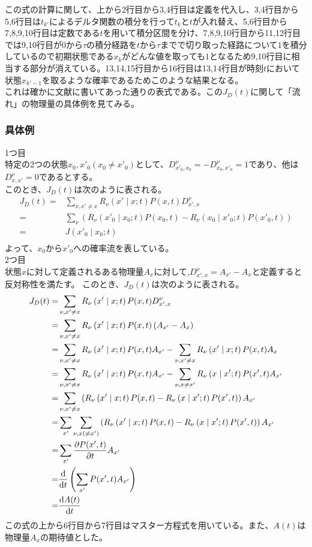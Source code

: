 \documentclass{ltjsarticle}
\begin{document}
この式の計算に関して、上から2行目から3,4行目は定義を代入し、3,4行目から5,6行目は$t_{k'}$によるデルタ関数の積分を行って$t_k$と$t$が入れ替え、5,6行目から7,8,9,10行目は定数である$t$を用いて積分区間を分け、7,8,9,10行目から11,12行目では9,10行目が$0$から$\tau$の積分経路を$t$から$\tau$までで切り取った経路について$1$を積分しているので初期状態である$x_k$がどんな値を取っても$1$となるため9,10行目に相当する部分が消えている。13,14,15行目から16行目は13,14行目が時刻$t$において状態$x_{k'-1}$を取るような確率であるためこのような結果となる。\\
これは確かに文献に書いてあった通りの表式である。この$J_D(t)$に関して「流れ」の物理量の具体例を見てみる。
\subsubsection{具体例}
1つ目\\
特定の2つの状態$x_0,x'_0(x_0\neq x'_0)$として、$D^{\nu}_{x'_0,x_0}=-D^{\nu}_{x_0,x'_0}=1$であり、他は$D^{\nu}_{x,x'}=0$であるとする。\\
このとき、$J_D(t)$は次のように表される。
\begin{align}
  J_D(t)=&\sum_{\nu,x'\neq x}R_{\nu}\left(x'\mid x;t\right)P(x,t)D^{\nu}_{x',x}\\
  =&\sum_\nu\left( R_{\nu}\left(x'_0\mid x_0;t\right)P(x_0,t)-R_{\nu}\left(x_0\mid x'_0;t\right)P(x'_0,t) \right)\\
  =&J(x'_0\mid x_0;t)\\
\end{align}
よって、$x_0$から$x'_0$への確率流を表している。\\
2つ目\\
状態$x$に対して定義されるある物理量$A_x$に対して,$D^\nu_{x',x}=A_{x'}-A_x$と定義すると反対称性を満たす。
このとき、$J_D(t)$は次のように表される。
\begin{align}
  J_D(t)=&\sum_{\nu,x'\neq x}R_{\nu}\left(x'\mid x;t\right)P(x,t)D^{\nu}_{x',x}\\
  =&\sum_{\nu,x'\neq x}R_{\nu}\left(x'\mid x;t\right)P(x,t)\left( A_{x'}-A_x \right) \\
  =&\sum_{\nu,x'\neq x}R_{\nu}\left(x'\mid x;t\right)P(x,t)A_{x'}-\sum_{\nu,x'\neq x}R_{\nu}\left(x'\mid x;t\right)P(x,t)A_x \\
  =&\sum_{\nu,x'\neq x}R_{\nu}\left(x'\mid x;t\right)P(x,t)A_{x'}-\sum_{\nu,x\neq x'}R_{\nu}\left(x\mid x';t\right)P(x',t)A_{x'} \\
  =&\sum_{\nu,x'\neq x}\left( R_{\nu}\left(x'\mid x;t\right)P(x,t)- R_{\nu}\left(x\mid x';t\right)P(x',t)\right) A_{x'}\\
  =&\sum_{x'}\sum_{\nu,x(\neq x')}\left( R_{\nu}\left(x'\mid x;t\right)P(x,t)- R_{\nu}\left(x\mid x';t\right)P(x',t)\right) A_{x'}\\
  =&\sum_{x'}\pdv{P(x',t)}{t}A_{x'}\\
  =&\dv{t}\left( \sum_{x'}P(x',t)A_{x'} \right) \\
  =&\dv{A(t)}{t}
\end{align}
この式の上から6行目から7行目はマスター方程式を用いている。また、$A(t)$は物理量$A_x$の期待値とした。\\
\end{document}
